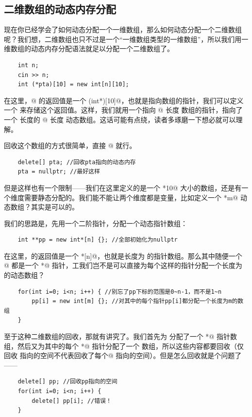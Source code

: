 \subsection*{二维数组的动态内存分配}
现在你已经学会了如何动态分配一个一维数组，那么如何动态分配一个二维数组呢？我们想，二维数组也只不过是一个``一维数组类型的一维数组''，所以我们用一维数组的动态内存分配语法就足以分配一个二维数组了。
\begin{lstlisting}
    int n;
    cin >> n;
    int (*pta)[10] = new int[n][10];
\end{lstlisting}
在这里，\lstinline@new[]@ 的返回值是一个 \lstinline@(int*)[10]@，也就是指向数组的指针，我们可以定义一个 \lstinline@pta@ 来存储这个返回值。这样，我们就用一个指向 @ 长度 \lstinline@int@ 数组的指针，指向了一个 \lstinline@n@ 长度的 @ 长度 \lstinline@int@ 动态数组。这话可能有点绕，读者多琢磨一下想必就可以理解。\par
回收这个数组的方式很简单，直接 \lstinline@delete[]@ 就行。
\begin{lstlisting}
    delete[] pta; //回收pta指向的动态内存
    pta = nullptr; //最好这样
\end{lstlisting}\par
但是这样也有一个限制——我们在这里定义的是一个 \lstinline@n*10@ 大小的数组，还是有一个维度需要静态分配的。我们能不能让两个维度都是变量，比如定义一个 \lstinline@n*m@ 动态数组？其实是可以的。\par
我们的思路是，先用一个二阶指针，分配一个动态指针数组：
\begin{lstlisting}
    int **pp = new int*[n] {}; //全部初始化为nullptr
\end{lstlisting}
在这里，\lstinline@new@ 的返回值是一个 \lstinline@int*[n]@，也就是长度为 \lstinline@n@ 的指针数组。那么其中随便一个 \lstinline@pp[i]@ 都是一个 \lstinline@int*@ 指针，工我们岂不是可以直接为每个这样的指针分配一个长度为 \lstinline@m@ 的动态数组？
\begin{lstlisting}
    for(int i=0; i<n; i++) { //别忘了pp下标的范围是0~n-1，而不是1~n
        pp[i] = new int[m] {}; //对其中的每个指针pp[i]都分配一个长度为m的数组
    }
\end{lstlisting}
至于这种二维数组的回收，那就有讲究了。我们首先为 \lstinline@pp@ 分配了一个 \lstinline@int*@ 指针数组，然后又为其中的每个 \lstinline@int*@ 指针分配了一个 \lstinline@int@ 数组，所以这些内容都要回收（仅回收 \lstinline@pp@ 指向的空间不代表回收了每个\lstinline@pp[i]@ 指向的空间）。但是怎么回收就是个问题了——
\begin{lstlisting}
    delete[] pp; //回收pp指向的空间
    for(int i=0; i<n; i++) {
        delete[] pp[i]; //错误！
    }
\end{lstlisting}

